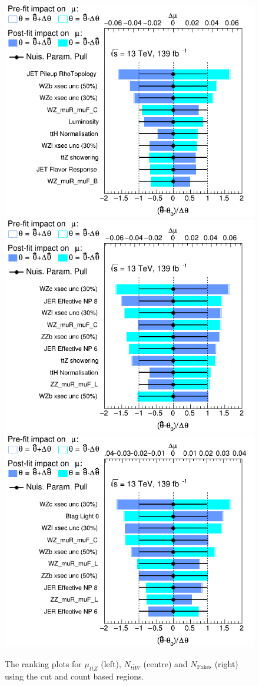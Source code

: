 \documentclass[bachelor,oneside, BCOR10mm,
			ngerman,english  %
]{GAUBM}
\begin{document}
\begin{figure}
	\centering
	\includegraphics[width=.32\textwidth]{figures/initial_config/ranking/RankingSysts_mu_ttZ_systs.png}
	\includegraphics[width=.32\textwidth]{figures/initial_config/ranking/RankingSysts_N_ttW_systs.png}
	\includegraphics[width=.32\textwidth]{figures/initial_config/ranking/RankingSysts_N_Fakes_systs.png}
	
	\caption{The ranking plots for $\mu_{t\bar{t}Z}$ (left), $N_{t\bar{t}W}$ (centre) and $N_\text{Fakes}$ (right) using the cut and count based regions.}
	\label{fig:InitialRankingPlots}
\end{figure}

\end{document}
